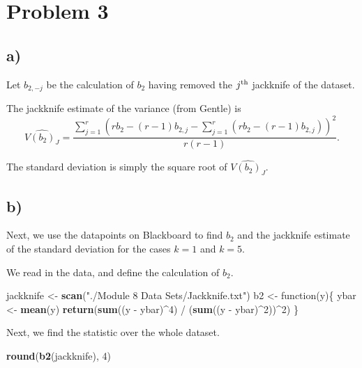 \documentclass[]{article}
\newenvironment{Shaded}{\begin{snugshade}}{\end{snugshade}}
\newcommand{\KeywordTok}[1]{\textcolor[rgb]{0.13,0.29,0.53}{\textbf{{#1}}}}
\newcommand{\DecValTok}[1]{\textcolor[rgb]{0.00,0.00,0.81}{{#1}}}
\newcommand{\StringTok}[1]{\textcolor[rgb]{0.31,0.60,0.02}{{#1}}}
\newcommand{\NormalTok}[1]{{#1}}
\begin{document}
\section{Problem 3}\label{problem-3}

\subsection{a)}\label{a-2}

Let \(b_{2, -j}\) be the calculation of \(b_2\) having removed the
\(j^{\rm{th}}\) jackknife of the dataset.

The jackknife estimate of the variance (from Gentle) is \[
\widehat{V(b_2)_J} = \frac{\sum_{j=1}^r (r b_2 - (r - 1) b_{2, j} -    \sum_{j=1}^r (r b_2 - (r - 1) b_{2, j}    ))^2  }{r (r -1)}.
\]

The standard deviation is simply the square root of
\(\widehat{V(b_2)_J}\).

\subsection{b)}\label{b-2}

Next, we use the datapoints on Blackboard to find \(b_2\) and the
jackknife estimate of the standard deviation for the cases \(k=1\) and
\(k=5\).

We read in the data, and define the calculation of \(b_2\).

\begin{Shaded}
\begin{Highlighting}[]
\NormalTok{jackknife <-}\StringTok{ }\KeywordTok{scan}\NormalTok{(}\StringTok{"./Module 8 Data Sets/Jackknife.txt"}\NormalTok{)}
\NormalTok{b2 <-}\StringTok{ }\NormalTok{function(y)\{}
  \NormalTok{ybar <-}\StringTok{ }\KeywordTok{mean}\NormalTok{(y)}
  \KeywordTok{return}\NormalTok{(}\KeywordTok{sum}\NormalTok{((y -}\StringTok{ }\NormalTok{ybar)^}\DecValTok{4}\NormalTok{) /}\StringTok{ }\NormalTok{(}\KeywordTok{sum}\NormalTok{((y -}\StringTok{ }\NormalTok{ybar)^}\DecValTok{2}\NormalTok{))^}\DecValTok{2}\NormalTok{)}
\NormalTok{\}}
\end{Highlighting}
\end{Shaded}

Next, we find the statistic over the whole dataset.

\begin{Shaded}
\begin{Highlighting}[]
\KeywordTok{round}\NormalTok{(}\KeywordTok{b2}\NormalTok{(jackknife), }\DecValTok{4}\NormalTok{)}
\end{Highlighting}
\end{Shaded}
\end{document}
